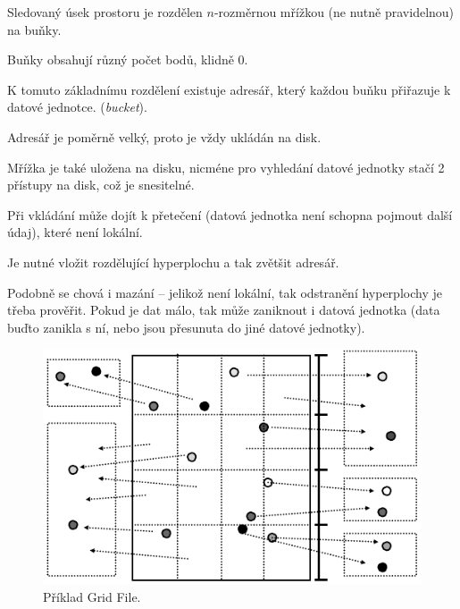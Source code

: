 \begin{compactitem}
    \item Sledovaný úsek prostoru je rozdělen $n$-rozměrnou mřížkou (ne nutně pravidelnou) na buňky. \begin{compactitem}
        \item Buňky obsahují různý počet bodů, klidně 0.
    \end{compactitem}

    \item K tomuto základnímu rozdělení existuje adresář, který každou buňku přiřazuje k datové jednotce. (\textit{bucket}). \begin{compactitem}
        \item Adresář je poměrně velký, proto je vždy ukládán na disk.
        \item Mřížka je také uložena na disku, nicméne pro vyhledání datové jednotky stačí 2 přístupy na disk, což je snesitelné.
    \end{compactitem}

    \item Při vkládání může dojít k přetečení (datová jednotka není schopna pojmout další údaj), které není lokální. \begin{compactitem}
        \item Je nutné vložit rozdělující hyperplochu a tak zvětšit adresář.
        \item Podobně se chová i mazání -- jelikož není lokální, tak odstranění hyperplochy je třeba prověřit. Pokud je dat málo, tak může zaniknout i datová jednotka (data buďto zanikla s ní, nebo jsou přesunuta do jiné datové jednotky).
    \end{compactitem}
\end{compactitem}

\begin{figure}[H]
    \centering
    \includegraphics[width=0.75\linewidth]{grid_file.pdf}
    \caption{Příklad Grid File.}
\end{figure}

